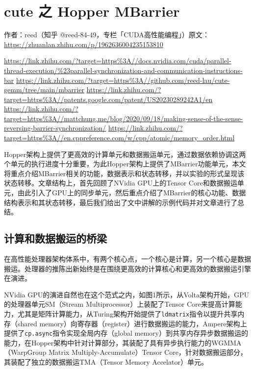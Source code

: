 \chapter{cute 之 Hopper MBarrier}

\begin{center}\small 作者：reed（知乎 @reed-84-49，专栏「CUDA高性能编程」）\quad 原文：\url{https://zhuanlan.zhihu.com/p/1962636004235153810}\end{center}

\urldef\reedVIIIurlA\url{https://link.zhihu.com/?target=https%3A//docs.nvidia.com/cuda/parallel-thread-execution/%23parallel-synchronization-and-communication-instructions-bar}
\urldef\reedVIIIurlB\url{https://link.zhihu.com/?target=https%3A//github.com/reed-lau/cute-gemm/tree/main/mbarrier}
\urldef\reedVIIIurlC\url{https://link.zhihu.com/?target=https%3A//patents.google.com/patent/US20230289242A1/en}
\urldef\reedVIIIurlD\url{https://link.zhihu.com/?target=https%3A//mattchung.me/blog/2020/09/18/making-sense-of-the-sense-reversing-barrier-synchronization/}
\urldef\reedVIIIurlE\url{https://link.zhihu.com/?target=https%3A//en.cppreference.com/w/cpp/atomic/memory_order.html}

Hopper架构上提供了更高效的计算单元和数据搬运单元，通过数据依赖协调这两个单元的执行进度十分重要，为此Hopper架构上提供了MBarrier功能单元，本文将重点介绍MBarrier相关的功能，数据表示和状态转移，并以实验的形式呈现该状态转移。文章结构上，首先回顾了NVidia GPU上的Tensor Core和数据搬运单元，由此引入了GPU上的同步单元，然后重点介绍了MBarrier的核心功能、数据结构表示和其状态转移，最后我们给出了文中讲解的示例代码并对文章进行了总结。

\section{计算和数据搬运的桥梁}

在高性能处理器架构体系中，有两个核心点，一个核心是计算，另一个核心是数据搬运。处理器的推陈出新始终是在围绕更高效的计算核心和更高效的数据搬运引擎在演进。

NVidia GPU的演进自然也在这个范式之内，如图1所示，从Volta架构开始，GPU的处理器单元SM（Stream Multiprocessor）上装配了Tensor Core来提高计算能力，尤其是矩阵计算能力，从Turing架构开始提供了\lstinline|ldmatrix|指令以提升共享内存（shared memory）向寄存器（register）进行数据搬运的能力，Ampere架构上提供了\lstinline|cp.async|指令实现全局内存（global memory）到共享内存异步数据搬运的能力，在Hopper架构中针对计算部分，其装配了具有异步执行能力的WGMMA（WarpGroup Matrix Multiply-Accumulate）Tensor Core，针对数据搬运部分，其装配了独立的数据搬运TMA（Tensor Memory Accelator）单元。

